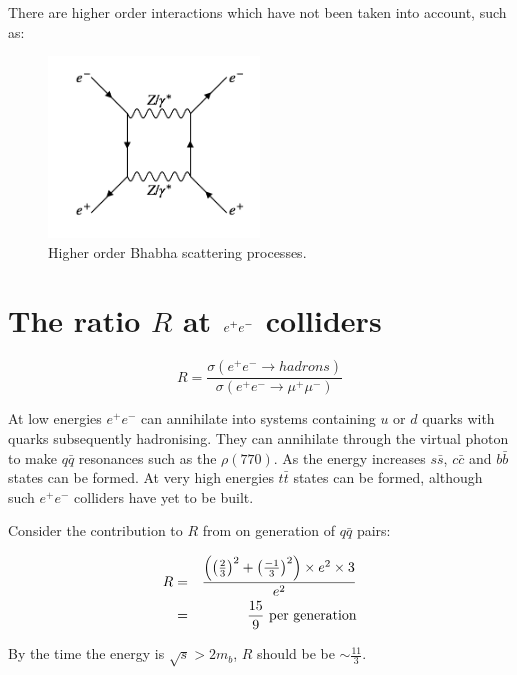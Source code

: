 There are higher order interactions which have not been taken into account, such as:

\begin{figure}[!htb]
  \begin{center}
    \includegraphics[width=0.5\textwidth]{images/web_feynman/image_30.png}
    \caption[Higher order Bhabha scattering processes]{Higher order Bhabha scattering processes.}
    \label{fig:ch8_Bhabha2}
  \end{center}
\end{figure}

\section{The ratio \texorpdfstring{$R$ at $e^+e^-$}{RAtEE} colliders}

\[
  R = \frac{\sigma(e^+e^- \to hadrons)}{\sigma(e^+e^- \to \mu^+\mu^-)}
\]

At low energies $e^+e^-$ can annihilate into systems containing $u$ or $d$ quarks with quarks subsequently hadronising.  They can annihilate through the virtual photon to make $q\bar{q}$ resonances such as the $\rho(770)$.  As the energy increases $s\bar{s}$, $c\bar{c}$ and $b\bar{b}$ states can be formed.  At very high energies $t\bar{t}$ states can be formed, although such $e^+e^-$ colliders have yet to be built.

Consider the contribution to $R$ from on generation of $q\bar{q}$ pairs:

\begin{eqnarray*}
  R & = & \frac{\left(\left(\frac{2}{3}\right)^2 + \left(\frac{-1}{3}\right)^2\right)\times e^2\times 3}{e^2} \\
  & = & \frac{15}{9} \textrm{ per generation}
\end{eqnarray*}

By the time the energy is $\sqrt{s}>2m_b$, $R$ should be be $\sim \frac{11}{3}$.

